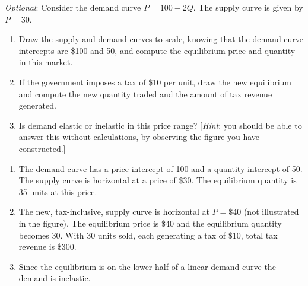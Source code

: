 \begin{enumialphparenastyle}
\begin{econex}\label{ex:ch4ex10}
\textit{Optional}: Consider the demand curve $P=100-2Q$. The supply curve is given by $P=30$.
\begin{enumerate}
\item	Draw the supply and demand curves to scale, knowing that the demand curve intercepts are \$100 and 50, and compute the equilibrium price and quantity in this market.
\item	If the government imposes a tax of \$10 per unit, draw the new equilibrium and compute the new quantity traded and the amount of tax revenue generated. 
\item	Is demand elastic or inelastic in this price range? [\textit{Hint}: you should be able to answer this without calculations, by observing the figure you have constructed.]
\end{enumerate}
\begin{econsolution}
\begin{enumerate}
\item	The demand curve has a price intercept of 100 and a quantity intercept of 50. The supply curve is horizontal at a price of \$30. The equilibrium quantity is 35 units at this price.
\item	The new, tax-inclusive, supply curve is horizontal at $P=\$40$ (not illustrated in the figure). The equilibrium price is \$40 and the	equilibrium quantity becomes 30. With 30 units sold, each generating a tax of \$10, total tax revenue is \$300.
\item	Since the equilibrium is on the lower half of a linear demand curve the demand is inelastic.
\end{enumerate}
\begin{center*}
\end{center*}
\end{econsolution}
\end{econex}


\end{enumialphparenastyle}
